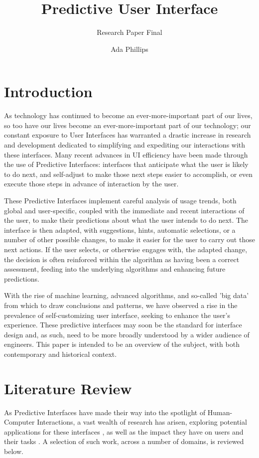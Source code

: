 \documentclass[format=acmsmall, nonacm, authorversion, screen]{acmart}
\title{Predictive User Interface}
\subtitle{Research Paper Final}
\author{Ada Phillips}
\affiliation{%
	\institution{Rochester Institute of Technology}}
\begin{document}
\maketitle

\section{Introduction}
As technology has continued to become an ever-more-important part of our lives, so too have our lives become an ever-more-important part of our technology; our constant exposure to User Interfaces has warranted a drastic increase in research and development dedicated to simplifying and expediting our interactions with these interfaces. Many recent advances in UI efficiency have been made through the use of Predictive Interfaces: interfaces that anticipate what the user is likely to do next, and self-adjust to make those next steps easier to accomplish, or even execute those steps in advance of interaction by the user. 

These Predictive Interfaces implement careful analysis of usage trends, both global and user-specific, coupled with the immediate and recent interactions of the user, to make their predictions about what the user intends to do next. The interface is then adapted, with suggestions, hints, automatic selections, or a number of other possible changes, to make it easier for the user to carry out those next actions. If the user selects, or otherwise engages with, the adapted change, the decision is often reinforced within the algorithm as having been a correct assessment, feeding into the underlying algorithms and enhancing future predictions. 

With the rise of machine learning, advanced algorithms, and so-called 'big data' from which to draw conclusions and patterns, we have observed a rise in the prevalence of self-customizing user interface, seeking to enhance the user's experience. These predictive interfaces may soon be the standard for interface design and, as such, need to be more broadly understood by a wider audience of engineers. This paper is intended to be an overview of the subject, with both contemporary and historical context. 


\section{Literature Review} 
As Predictive Interfaces have made their way into the spotlight of Human-Computer Interactions, a vast wealth of research has arisen, exploring potential applications for these interfaces \citep{bridle2005predictive, ruotsalo2014intent, ahmad2018selection, xia2014zerolatency}, as well as the impact they have on users and their tasks \citep{quinn2016costbenefit, ruotsalo2014intent, xia2014zerolatency}. A selection of such work, across a number of domains, is reviewed below.
\end{document}
